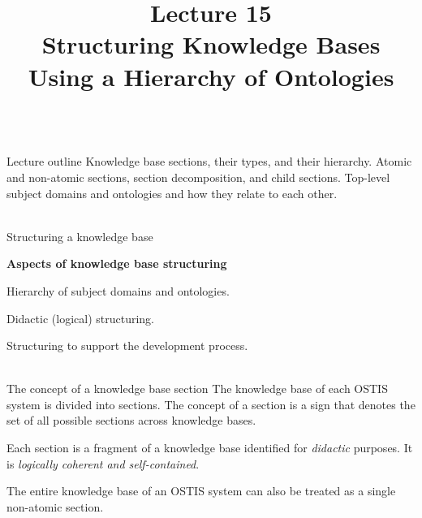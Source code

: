 \title{Lecture 15\\Structuring Knowledge Bases Using a Hierarchy of Ontologies}

\begin{frame}
	\titlepage
\end{frame}

\begin{frame}{\\Lecture outline}
	\topline
	\justifying
	Knowledge base sections, their types, and their hierarchy. Atomic and non-atomic sections, section decomposition, and child sections. Top-level subject domains and ontologies and how they relate to each other.
\end{frame}

\begin{frame}{\\Structuring a knowledge base}
	\topline
	\justifying
	\begin{SCn}
		\textbf{Aspects of knowledge base structuring}
		\begin{textitemize}
			\item Hierarchy of subject domains and ontologies.
			\item Didactic (logical) structuring.
			\item Structuring to support the development process.
		\end{textitemize}
	\end{SCn}
\end{frame}

\begin{frame}{\\The concept of a knowledge base section}
	\topline
	\justifying
	The knowledge base of each OSTIS system is divided into sections. The concept of a section is a sign that denotes the set of all possible sections across knowledge bases.
	\bigskip

	Each section is a fragment of a knowledge base identified for \textit{didactic} purposes. It is \textit{logically coherent and self-contained}.

	The entire knowledge base of an OSTIS system can also be treated as a single non-atomic section.
\end{frame}

